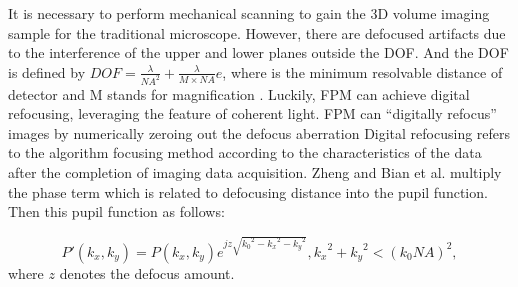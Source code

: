 \documentclass[journal,review,submit,pdftex,moreauthors]{Definitions/mdpi}
\begin{document}
It is necessary to perform mechanical scanning to gain the 3D volume imaging sample for the traditional microscope. However, there are defocused artifacts due to the interference of the upper and lower planes outside the DOF. And the DOF is defined by $DOF = \frac{\lambda }{{N{A^2}}} + \frac{\lambda }{{M\times NA}}e$, where is the minimum resolvable distance of detector and M stands for magnification \cite{pan2020high}. Luckily, FPM can achieve digital refocusing, leveraging the feature of coherent light. FPM can “digitally refocus” images by numerically zeroing out the defocus aberration Digital refocusing refers to the algorithm focusing method according to the characteristics of the data after the completion of imaging data acquisition. Zheng and Bian et al. multiply the phase term which is related to defocusing distance into the pupil function. Then this pupil function as follows:

\begin{equation}
P'({k_x},{k_y}) = P({k_x},{k_y}){e^{jz\sqrt {{k_0}^2 - {k_x}^2 - {k_y}^2} }},{k_x}^2 + {k_y}^2 < {({k_0}NA)^2}, 
\end{equation}
where $z$ denotes the defocus amount. 
\end{document}
